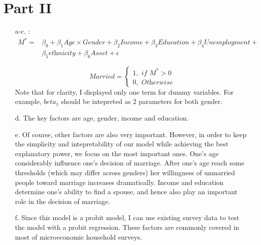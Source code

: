 \documentclass[12pt]{article}%
\begin{document}
\section{Part II}
\begin{enumerate}
	\item[a-c.]:
\begin{equation}
\begin{split}
M^* = & \beta_0 + \beta_1\textit{Age} \times \textit{Gender} + \beta_2\textit{Income} + \beta_3\textit{Education} + \beta_4\textit{Unemployment} + \\
	 & \beta_5\textit{ethnicity} + \beta_6 \textit{Asset} + \epsilon
\end{split}
\end{equation}

$$ \textit{Married} = 
	\begin{cases}
	1, \textit{ if } M^*>0 \\
	0, \textit{ Otherwise}
	\end{cases}
$$
Note that for clarity, I displayed only one term for dummy variables. For example, $beta_1$ should be intepreted as 2 parameters for both gender. 

\item [d.] The key factors are age, gender, income and education.
\item [e.] Of course, other factors are also very important. However, in order to keep the simplicity and intepretability of our model while achieving the best explanatory power, we focus on the most important ones. One's age considerably influence one's decision of marriage. After one's age reach some thresholds (which may differ across genders) her willingness of unmarried people toward marriage increases dramatically. Income and education determine one's ability to find a spouse, and hence also play an important role in the decision of marriage.
\item [f.] Since this model is a probit model, I can use existing survey data to test the model with a probit regression. These factors are commonly covered in most of microeconomic household surveys.
\end{enumerate}
\end{document}
